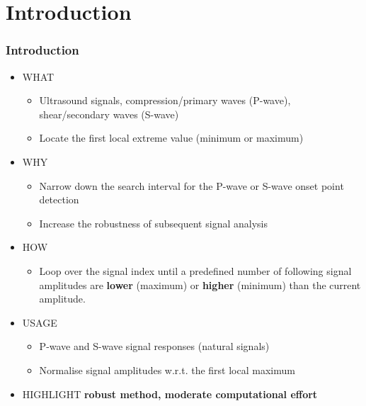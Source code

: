 \documentclass[11pt,aspectratio=169]{beamer}
\begin{document}
	\section{Introduction}
	\begin{frame}
		\frametitle{Introduction}
		\begin{itemize}
			\item \textcolor{RIPtitlecol}{WHAT}
			\begin{itemize}
				\item Ultrasound signals, compression/primary waves (P-wave), shear/secondary waves (S-wave)
				\item Locate the first local extreme value (minimum or maximum)
			\end{itemize}
			\item \textcolor{RIPtitlecol}{WHY}
			\begin{itemize}
				\item Narrow down the search interval for the P-wave or S-wave onset point detection
				\item Increase the robustness of subsequent signal analysis
			\end{itemize}
			\item \textcolor{RIPtitlecol}{HOW}
			\begin{itemize}
				\item Loop over the signal index until a predefined number of following signal amplitudes are \textbf{lower} (maximum) or \textbf{higher} (minimum) than the current amplitude.
			\end{itemize}
			\item \textcolor{RIPtitlecol}{USAGE}
				\begin{itemize}
					\item P-wave and S-wave signal responses (natural signals)
					\item Normalise signal amplitudes w.r.t. the first local maximum
				\end{itemize}
			\item \textcolor{RIPtitlecol}{HIGHLIGHT} \textbf{robust method, moderate computational effort}
		\end{itemize}
	\end{frame}
\end{document}
